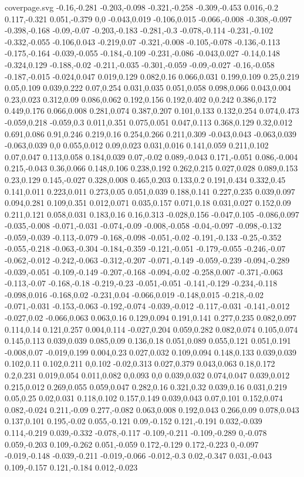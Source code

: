 \begin{filecontents}[noheader]{coverpage.svg}
-0.16,-0.281 -0.203,-0.098 -0.321,-0.258 -0.309,-0.453 0.016,-0.2 0.117,-0.321 0.051,-0.379 0,0 -0.043,0.019 -0.106,0.015 -0.066,-0.008 -0.308,-0.097 -0.398,-0.168 -0.09,-0.07 -0.203,-0.183 -0.281,-0.3 -0.078,-0.114 -0.231,-0.102 -0.332,-0.055 -0.106,0.043 -0.219,0.07 -0.321,-0.008 -0.105,-0.078 -0.136,-0.113 -0.175,-0.164 -0.039,-0.055 -0.184,-0.109 -0.231,-0.086 -0.043,0.027 -0.14,0.148 -0.324,0.129 -0.188,-0.02 -0.211,-0.035 -0.301,-0.059 -0.09,-0.027 -0.16,-0.058 -0.187,-0.015 -0.024,0.047 0.019,0.129 0.082,0.16 0.066,0.031 0.199,0.109 0.25,0.219 0.05,0.109 0.039,0.222 0.07,0.254 0.031,0.035 0.051,0.058 0.098,0.066 0.043,0.004 0.23,0.023 0.312,0.09 0.086,0.062 0.192,0.156 0.192,0.402 0,0.242 0.386,0.172 0.449,0.176 0.066,0.008 0.281,0.074 0.387,0.207 0.101,0.133 0.132,0.254 0.074,0.473 -0.059,0.218 -0.059,0.3 0.011,0.351 0.075,0.051 0.047,0.113 0.368,0.129 0.32,0.012 0.691,0.086 0.91,0.246 0.219,0.16 0.254,0.266 0.211,0.309 -0.043,0.043 -0.063,0.039 -0.063,0.039 0,0 0.055,0.012 0.09,0.023 0.031,0.016 0.141,0.059 0.211,0.102 0.07,0.047 0.113,0.058 0.184,0.039 0.07,-0.02 0.089,-0.043 0.171,-0.051 0.086,-0.004 0.215,-0.043 0.36,0.066 0.148,0.106 0.238,0.192 0.262,0.215 0.027,0.028 0.089,0.153 0.23,0.129 0.145,-0.027 0.328,0.008 0.465,0.203 0.133,0.2 0.191,0.434 0.332,0.45 0.141,0.011 0.223,0.011 0.273,0.05 0.051,0.039 0.188,0.141 0.227,0.235 0.039,0.097 0.094,0.281 0.109,0.351 0.012,0.071 0.035,0.157 0.071,0.18 0.031,0.027 0.152,0.09 0.211,0.121 0.058,0.031 0.183,0.16 0.16,0.313 -0.028,0.156 -0.047,0.105 -0.086,0.097 -0.035,-0.008 -0.071,-0.031 -0.074,-0.09 -0.008,-0.058 -0.04,-0.097 -0.098,-0.132 -0.059,-0.039 -0.113,-0.079 -0.168,-0.098 -0.051,-0.02 -0.191,-0.133 -0.25,-0.352 -0.055,-0.218 -0.063,-0.304 -0.184,-0.359 -0.121,-0.051 -0.179,-0.055 -0.246,-0.07 -0.062,-0.012 -0.242,-0.063 -0.312,-0.207 -0.071,-0.149 -0.059,-0.239 -0.094,-0.289 -0.039,-0.051 -0.109,-0.149 -0.207,-0.168 -0.094,-0.02 -0.258,0.007 -0.371,-0.063 -0.113,-0.07 -0.168,-0.18 -0.219,-0.23 -0.051,-0.051 -0.141,-0.129 -0.234,-0.118 -0.098,0.016 -0.168,0.02 -0.231,0.04 -0.066,0.019 -0.148,0.015 -0.218,-0.02 -0.071,-0.031 -0.153,-0.063 -0.192,-0.074 -0.039,-0.012 -0.117,-0.031 -0.141,-0.012 -0.027,0.02 -0.066,0.063 0.063,0.16 0.129,0.094 0.191,0.141 0.277,0.235 0.082,0.097 0.114,0.14 0.121,0.257 0.004,0.114 -0.027,0.204 0.059,0.282 0.082,0.074 0.105,0.074 0.145,0.113 0.039,0.039 0.085,0.09 0.136,0.18 0.051,0.089 0.055,0.121 0.051,0.191 -0.008,0.07 -0.019,0.199 0.004,0.23 0.027,0.032 0.109,0.094 0.148,0.133 0.039,0.039 0.102,0.11 0.102,0.211 0,0.102 -0.02,0.313 0.027,0.379 0.043,0.063 0.18,0.172 0.2,0.231 0.019,0.054 0.011,0.082 0,0.093 0,0 0.039,0.032 0.074,0.047 0.039,0.012 0.215,0.012 0.269,0.055 0.059,0.047 0.282,0.16 0.321,0.32 0.039,0.16 0.031,0.219 0.05,0.25 0.02,0.031 0.118,0.102 0.157,0.149 0.039,0.043 0.07,0.101 0.152,0.074 0.082,-0.024 0.211,-0.09 0.277,-0.082 0.063,0.008 0.192,0.043 0.266,0.09 0.078,0.043 0.137,0.101 0.195,-0.02 0.055,-0.121 0.09,-0.152 0.121,-0.191 0.032,-0.039 0.114,-0.219 0.039,-0.332 -0.078,-0.117 -0.109,-0.211 -0.109,-0.289 0,-0.078 0.059,-0.203 0.109,-0.262 0.051,-0.059 0.172,-0.129 0.172,-0.223 0,-0.097 -0.019,-0.148 -0.039,-0.211 -0.019,-0.066 -0.012,-0.3 0.02,-0.347 0.031,-0.043 0.109,-0.157 0.121,-0.184 0.012,-0.023 
\end{filecontents}
